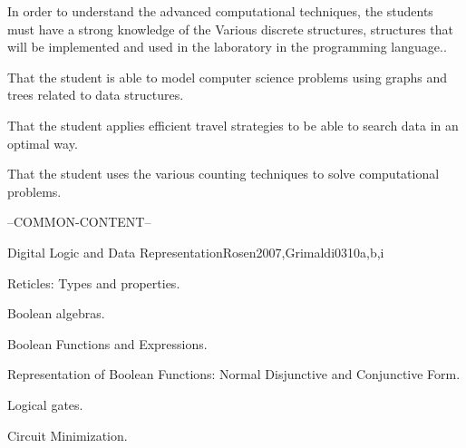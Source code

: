 \begin{syllabus}


\begin{justification}
In order to understand the advanced computational techniques, the students must have a strong knowledge of the
Various discrete structures, structures that will be implemented and used in the laboratory in the programming language..
\end{justification}

\begin{goals}
\item That the student is able to model computer science problems using graphs and trees related to data structures.
\item That the student applies efficient travel strategies to be able to search data in an optimal way.
\item That the student uses the various counting techniques to solve computational problems.
\end{goals}

--COMMON-CONTENT--

\begin{unit}{Digital Logic and Data Representation}{}{Rosen2007,Grimaldi03}{10}{a,b,i}
    \begin{topics}
     \item Reticles: Types and properties.
     \item Boolean algebras.
     \item Boolean Functions and Expressions.
     \item Representation of Boolean Functions: Normal Disjunctive and Conjunctive Form.
     \item Logical gates.
     \item Circuit Minimization.
    \end{topics}
 

\end{unit}
\end{syllabus}
